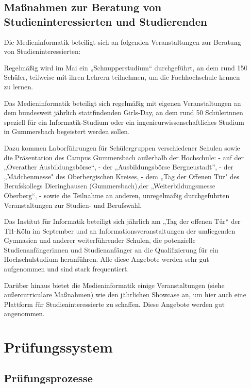 \section{Maßnahmen zur Beratung von Studieninteressierten und
Studierenden}\label{mauxdfnahmen-zur-beratung-von-studieninteressierten-und-studierenden}

Die Medieninformatik beteiligt sich an folgenden Veranstaltungen zur
Beratung von Studieninteressierten:

Regelmäßig wird im Mai ein „Schnupperstudium`` durchgeführt, an dem rund
150 Schüler, teilweise mit ihren Lehrern teilnehmen, um die
Fachhochschule kennen zu lernen.

Das Medieninformatik beteiligt sich regelmäßig mit eigenen
Veranstaltungen an dem bundesweit jährlich stattfindenden Girls-Day, an
dem rund 50 Schülerinnen speziell für ein Informatik-Studium oder ein
ingenieurwissenschaftliches Studium in Gummersbach begeistert werden
sollen.

Dazu kommen Laborführungen für Schülergruppen verschiedener Schulen
sowie die Präsentation des Campus Gummersbach außerhalb der Hochschule:
- auf der „Overather Ausbildungsbörse``, - der „Ausbildungsbörse
Bergneustadt'', - der „Mädchenmesse" des Oberbergischen Kreises, - dem
„Tag der Offenen Tür" des Berufskollegs Dieringhausen (Gummersbach),der
„Weiterbildungsmesse Oberberg``, - sowie die Teilnahme an anderen,
unregelmäßig durchgeführten Veranstaltungen zur Studien- und Berufswahl.

Das Institut für Informatik beteiligt sich jährlich am „Tag der offenen
Tür`` der TH-Köln im September und an Informationsveranstaltungen der
umliegenden Gymnasien und anderer weiterführender Schulen, die
potenzielle Studienanfängerinnen und Studienanfänger an die
Qualifizierung für ein Hochschulstudium heranführen. Alle diese Angebote
werden sehr gut aufgenommen und sind stark frequentiert.

Darüber hinaus bietet die Medieninformatik einige Veranstaltungen (siehe
außercurriculare Maßnahmen) wie den jährlichen Showcase an, um hier auch
eine Plattform für Studieninteressierte zu schaffen. Diese Angebote
werden gut angenommen.

\chapter{Prüfungssystem}\label{pruxfcfungssystem}

\section{Prüfungsprozesse}\label{pruxfcfungsprozesse}

